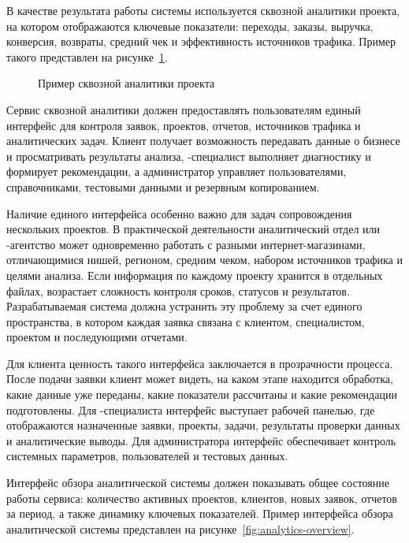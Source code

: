 В качестве результата работы системы используется  сквозной аналитики  проекта, на котором отображаются ключевые показатели: переходы, заказы, выручка, конверсия, возвраты, средний чек и эффективность источников трафика. Пример такого  представлен на рисунке~\ref{fig:dashboard-ecommerce}.

\begin{figure}[H]
    \centering
    \caption{Пример  сквозной аналитики  проекта}
    \label{fig:dashboard-ecommerce}
\end{figure}

Сервис сквозной аналитики должен предоставлять пользователям единый интерфейс для контроля заявок, проектов, отчетов, источников трафика и аналитических задач. Клиент получает возможность передавать данные о бизнесе и просматривать результаты анализа, -специалист выполняет диагностику и формирует рекомендации, а администратор управляет пользователями, справочниками, тестовыми данными и резервным копированием.

Наличие единого интерфейса особенно важно для задач сопровождения нескольких проектов. В практической деятельности аналитический отдел или -агентство может одновременно работать с разными интернет-магазинами, отличающимися нишей, регионом, средним чеком, набором источников трафика и целями анализа. Если информация по каждому проекту хранится в отдельных файлах, возрастает сложность контроля сроков, статусов и результатов. Разрабатываемая система должна устранить эту проблему за счет единого пространства, в котором каждая заявка связана с клиентом, специалистом, проектом и последующими отчетами.

Для клиента ценность такого интерфейса заключается в прозрачности процесса. После подачи заявки клиент может видеть, на каком этапе находится обработка, какие данные уже переданы, какие показатели рассчитаны и какие рекомендации подготовлены. Для -специалиста интерфейс выступает рабочей панелью, где отображаются назначенные заявки, проекты, задачи, результаты проверки данных и аналитические выводы. Для администратора интерфейс обеспечивает контроль системных параметров, пользователей и тестовых данных.

Интерфейс обзора аналитической системы должен показывать общее состояние работы сервиса: количество активных проектов, клиентов, новых заявок, отчетов за период, а также динамику ключевых показателей. Пример интерфейса обзора аналитической системы представлен на рисунке~\ref{fig:analytics-overview}.

